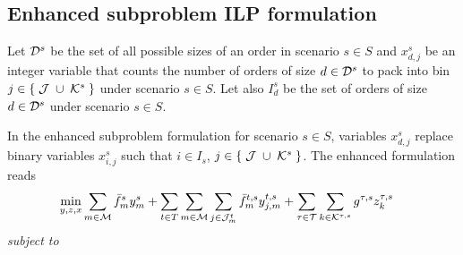 \documentclass[a4paper,11pt]{article}
\begin{document}
	\subsection{Enhanced subproblem ILP formulation}\label{ss:enhm}
	Let $ {\cal D}^s$ be the set of all possible sizes of an order in scenario $ s \in S$ and $ x^{s}_{d,j}$ be an integer variable that counts the number of orders of size $ d \in {\cal D}^s$ to pack into bin $ j \in \{ \; {\cal J} \; \cup \; {\cal K}^{s} \; \}$ under scenario $ s \in S$.
	Let also $ I^s_d$ be the set of orders of size $ d \in {\cal D}^s$ under scenario $ s \in S$.
	
	In the enhanced subproblem formulation for scenario $ s \in S$, variables $ x^{s}_{d,j}$ replace binary variables $ x^{s}_{i,j}$ such that $ i \in I_s$, $ j \in \{ \; {\cal J} \; \cup \; {\cal K}^{s} \; \}$.
	The enhanced formulation reads
	\begin{equation}
	\begin{split}
		\min_{y,z,x} & \sum_{m \in \cal M} \bar{f}^s_m y^s_{m} + \sum_{t \in T} \sum_{m \in {{\cal M}}} \sum_{j \in {\cal J}_{m}^t} \bar{f}_{m}^{t,s} y^{t,s}_{j,m} + \sum_{\tau \in \cal T} \sum_{k \in {\cal K}^{\tau,s}} g^{\tau,s} z_k^{\tau,s}\label{eq:depphsenh:objf}
	\end{split}
	\end{equation}
	\textit{subject to}
\end{document}
